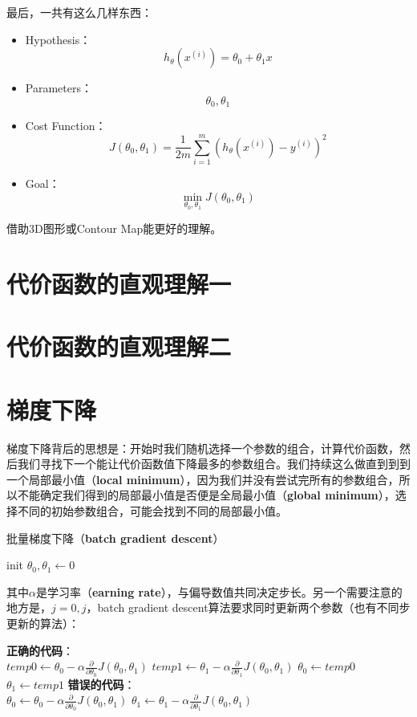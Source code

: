 \documentclass[../main.tex]{subfiles}
\begin{document}
最后，一共有这么几样东西：
\begin{itemize}
    \item Hypothesis：\[h_θ(x^{(i)}) = θ_0+θ_1x\]
    \item Parameters：\[θ_0,θ_1\]
    \item Cost Function：\[J(θ_0,θ_1) = \frac{1}{2m}\sum\limits_{i=1}^m ( h_{θ}(x^{(i)})-y^{(i)} )^{2}\]
    \item Goal：\[\min\limits_{θ_0, θ_1}J(θ_0, θ_1)\]
\end{itemize}


借助3D图形或Contour Map能更好的理解。

\section{代价函数的直观理解一}
\section{代价函数的直观理解二}

\section{梯度下降}
梯度下降背后的思想是：开始时我们随机选择一个参数的组合，计算代价函数，然后我们寻找下一个能让代价函数值下降最多的参数组合。我们持续这么做直到到到一个局部最小值（\textbf{local minimum}），因为我们并没有尝试完所有的参数组合，所以不能确定我们得到的局部最小值是否便是全局最小值（\textbf{global minimum}），选择不同的初始参数组合，可能会找到不同的局部最小值。
\begin{algorithm}[H]
    \caption{批量梯度下降（\textbf{batch gradient descent}）}
    init \(θ_0, θ_1← 0\)\;
\end{algorithm}
其中\(α\)是学习率（\textbf{earning rate}），与偏导数值共同决定步长。另一个需要注意的地方是，\(j=0, j\)，batch gradient descent算法要求同时更新两个参数（也有不同步更新的算法）：\\
\begin{algorithm}[H]
    \textbf{正确的代码}：\\
    \(temp0 ← θ_0 - α\frac{∂}{∂θ_0}J(θ_0,θ_1)\)\;
    \(temp1 ← θ_1 - α\frac{∂}{∂θ_1}J(θ_0,θ_1)\)\;
    \(θ_0 ← temp0\)\;
    \(θ_1 ← temp1\)\;
    {\bfseries\color{red}错误的代码}：\\
    \(θ_0 ← θ_0 - α\frac{∂}{∂θ_0}J(θ_0,θ_1)\)\;
    \(θ_1 ← θ_1 - α\frac{∂}{∂θ_1}J(θ_0,θ_1)\)\;
\end{algorithm}
\end{document}

